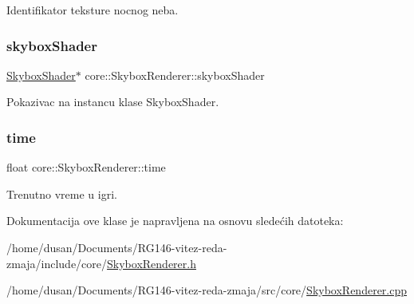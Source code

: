 Identifikator teksture nocnog neba. 

\mbox{\label{classcore_1_1SkyboxRenderer_abaf903d3d4e235215d0252b3e2693ad8}} 
\subsubsection{\texorpdfstring{skybox\+Shader}{skyboxShader}}
{\footnotesize\ttfamily \hyperlink{classshader_1_1SkyboxShader}{Skybox\+Shader}$\ast$ core\+::\+Skybox\+Renderer\+::skybox\+Shader\hspace{0.3cm}{\ttfamily [private]}}



Pokazivac na instancu klase Skybox\+Shader. 

\mbox{\label{classcore_1_1SkyboxRenderer_a399f6a16f9c5778419942ae35a0d3e82}} 
\subsubsection{\texorpdfstring{time}{time}}
{\footnotesize\ttfamily float core\+::\+Skybox\+Renderer\+::time\hspace{0.3cm}{\ttfamily [private]}}



Trenutno vreme u igri. 



Dokumentacija ove klase je napravljena na osnovu sledećih datoteka\+:\begin{DoxyCompactItemize}
\item 
/home/dusan/\+Documents/\+R\+G146-\/vitez-\/reda-\/zmaja/include/core/\hyperlink{SkyboxRenderer_8h}{Skybox\+Renderer.\+h}\item 
/home/dusan/\+Documents/\+R\+G146-\/vitez-\/reda-\/zmaja/src/core/\hyperlink{SkyboxRenderer_8cpp}{Skybox\+Renderer.\+cpp}\end{DoxyCompactItemize}
